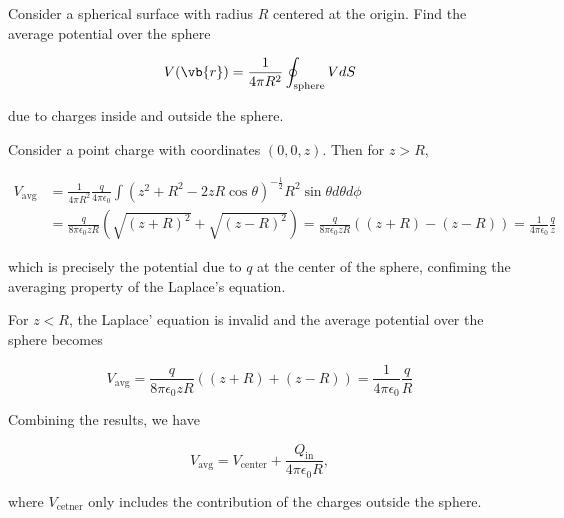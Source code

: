 \documentclass[english,a4paper,12pt]{report}
\begin{document}
{Consider a spherical surface with radius \(R\) centered at the origin. Find the average potential over the sphere

\begin{equation}
    V(\vb{r} ) = \frac{1}{4\pi R^2}\oint_{\text{sphere} } VdS
\end{equation}

due to charges inside and outside the sphere.}
{Consider a point charge with coordinates \((0,0,z)\). Then for \(z>R\),

\begin{equation}
    \begin{aligned}
        V_{\text{avg} } &= \frac{1}{4\pi R^2} \frac{q}{4\pi\epsilon_0} \int (z^2+R^2-2zR\cos \theta )^{-\frac{1}{2}} R^2\sin \theta d\theta d\phi \\ &= \frac{q}{8\pi \epsilon_0zR} (\sqrt{(z+R)^2} + \sqrt{(z-R)^2} ) = \frac{q}{8\pi \epsilon_0zR} ((z+R)-(z-R)) = \frac{1}{4\pi\epsilon_0} \frac{q}{z} 
    \end{aligned}
\end{equation}

which is precisely the potential due to \(q\) at the center of the sphere, confiming the averaging property of the Laplace's equation.

For \(z<R\), the Laplace' equation is invalid and the average potential over the sphere becomes 

\begin{equation}
    V_{\text{avg} } =  \frac{q}{8\pi \epsilon_0zR} ((z+R) + (z-R)) = \frac{1}{4\pi\epsilon_0} \frac{q}{R}
\end{equation}

Combining the results, we have

\begin{equation}
    V_{\text{avg} } = V_{\text{center} } + \frac{Q_{\text{in} } }{4\pi \epsilon _0 R},
\end{equation}

where \(V_{\text{cetner} } \) only includes the contribution of the charges outside the sphere. 
} 
\end{document}
